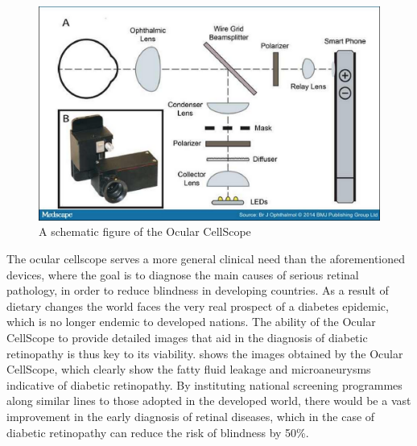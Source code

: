 \begin{figure}[htbp]
\centering
\includegraphics{figures/ocular}
\caption{A schematic figure of the Ocular CellScope \cite{medscape} }
\label{fig:ocular}
\end{figure}



The ocular cellscope serves a more general clinical need than the aforementioned
devices, where the goal is to diagnose the main causes of serious retinal pathology,
in order to reduce blindness in developing countries. As a result of dietary changes
the world faces the very real prospect of a diabetes epidemic, which is no longer
endemic to developed nations. \cite{burgess2013diabetic} The ability of the Ocular
CellScope to provide detailed images that aid in the diagnosis of diabetic retinopathy
is thus key to its viability.  shows the images obtained by the Ocular
CellScope, which clearly show the fatty fluid leakage and microaneurysms indicative of
diabetic retinopathy. By instituting national screening programmes along similar lines
to those adopted in the developed world, there would be a vast improvement in the early
diagnosis of retinal diseases, which in the case of diabetic retinopathy can reduce the
risk of blindness by 50\%. \cite{abramoff2010automated}


